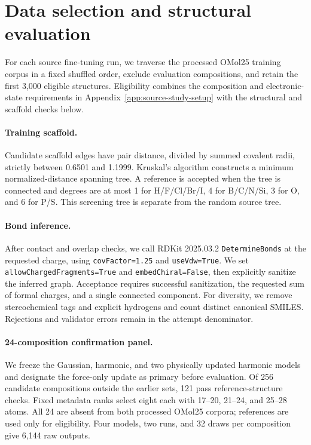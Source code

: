 \section{Data selection and structural evaluation}\label{app:data-evaluation}
For each source fine-tuning run, we traverse the processed OMol25 training corpus in a fixed shuffled order, exclude evaluation compositions, and retain the first 3,000 eligible structures. Eligibility combines the composition and electronic-state requirements in Appendix~\ref{app:source-study-setup} with the structural and scaffold checks below.

\paragraph{Training scaffold.}
Candidate scaffold edges have pair distance, divided by summed covalent radii, strictly between 0.6501 and 1.1999. Kruskal's algorithm constructs a minimum normalized-distance spanning tree. A reference is accepted when the tree is connected and degrees are at most 1 for H/F/Cl/Br/I, 4 for B/C/N/Si, 3 for O, and 6 for P/S. This screening tree is separate from the random source tree.

\paragraph{Bond inference.}
After contact and overlap checks, we call RDKit 2025.03.2 \texttt{DetermineBonds} at the requested charge, using \texttt{covFactor=1.25} and \texttt{useVdw=True}. We set \texttt{allowChargedFragments=True} and \texttt{embedChiral=False}, then explicitly sanitize the inferred graph. Acceptance requires successful sanitization, the requested sum of formal charges, and a single connected component. For diversity, we remove stereochemical tags and explicit hydrogens and count distinct canonical SMILES. Rejections and validator errors remain in the attempt denominator.

\paragraph{24-composition confirmation panel.}
We freeze the Gaussian, harmonic, and two physically updated harmonic models and designate the force-only update as primary before evaluation. Of 256 candidate compositions outside the earlier sets, 121 pass reference-structure checks. Fixed metadata ranks select eight each with 17--20, 21--24, and 25--28 atoms. All 24 are absent from both processed OMol25 corpora; references are used only for eligibility. Four models, two runs, and 32 draws per composition give 6,144 raw outputs.
